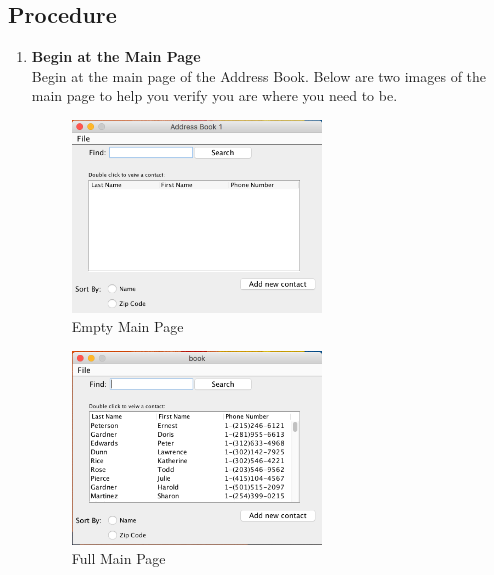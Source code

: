 \documentclass[a4paper, 11pt]{article}
\begin{document}
\subsection{Procedure}
\begin{enumerate}[label=\textbf{\arabic*})]
    \item{\textbf{Begin at the Main Page}}\\ Begin at the main page of the Address Book. Below are two images of the main page to help you verify you are where you need to be.
    
    \begin{figure}[h!]
    \centering
      \includegraphics[width=250]{main_page_empty.png}
      \caption{Empty Main Page}
    \end{figure}

    \begin{figure}[h!]
    \centering
      \includegraphics[width=250]{main_page_full.png}
      \caption{Full Main Page}
    \end{figure}
    

\end{enumerate}
\end{document}
